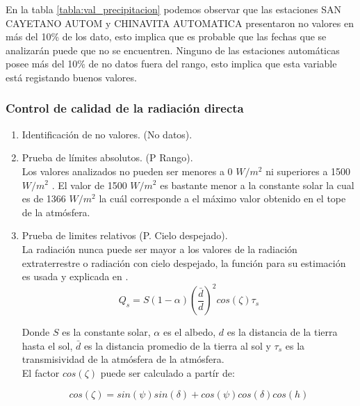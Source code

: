 En la tabla \ref{tabla:val_precipitacion} podemos observar que las estaciones SAN CAYETANO AUTOM y CHINAVITA AUTOMATICA presentaron no valores en más del 10\% de los dato, esto implica que es probable que las fechas que se analizarán puede que no se encuentren. Ninguno de las estaciones automáticas posee más del 10\% de no datos fuera del rango, esto implica que esta variable está registando buenos valores.


\subsubsection{Control de calidad de la radiación directa}

\begin{enumerate}
\item Identificación de no valores. (No datos).\\


\item Prueba de límites absolutos. (P Rango).\\
Los valores analizados no pueden ser menores a 0 $W/m^2$ ni superiores a 1500 $W/m^2$ \citep{estevez2011}. El valor de 1500 $W/m^2$ es bastante menor a la constante solar la cual es de 1366 $W/m^2$ la cuál corresponde a el máximo valor obtenido en el tope de la atmósfera.

\item Prueba de limites relativos (P. Cielo despejado).\\
La radiación nunca puede ser mayor a los valores de la radiación extraterrestre o radiación con cielo despejado, la función para su estimación es usada y explicada en  \citet{Allen1994}.\\

\centering 
\begin{equation}
    Q_s = S(1-\alpha)(\frac{\bar{d}}{d})^2cos(\zeta)\tau_s
\end{equation}

Donde $S$ es la constante solar, $\alpha$ es el albedo, $d$ es la distancia de la tierra hasta el sol, $\bar{d}$ es la distancia promedio de la tierra al sol y $\tau_s$ es la transmisividad de la atmósfera de la atmósfera.\\

El factor $cos(\zeta)$ puede ser calculado a partír de:

\begin{equation}
    cos(\zeta) = sin(\psi)sin(\delta) + cos(\psi)cos(\delta)cos(h)
\end{equation}


\end{enumerate}
